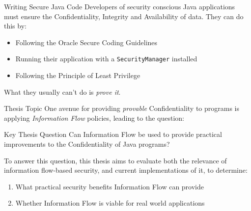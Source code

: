 \begin{frame}{Writing Secure Java Code}
	Developers of security conscious Java applications must ensure the Confidentiality, Integrity and Availability of data. They can do this by:
	
	\begin{itemize}
		\item Following the Oracle Secure Coding Guidelines
		\item Running their application with a \texttt{SecurityManager} installed
		\item Following the Principle of Least Privilege
	\end{itemize}
	
	What they usually can't do is \textit{prove it}.
\end{frame}

\begin{frame}{Thesis Topic}
	One avenue for providing \textit{provable} Confidentiality to programs is applying \textit{Information Flow} policies, leading to the question:
	
	\begin{block}{Key Thesis Question}
		Can Information Flow be used to provide practical improvements to the Confidentiality of Java programs?
	\end{block}
	
	To answer this question, this thesis aims to evaluate both the relevance of information flow-based security, and current implementations of it, to determine:
	
	\begin{enumerate}
		\item What practical security benefits Information Flow can provide
		\item Whether Information Flow is viable for real world applications
	\end{enumerate}
\end{frame}